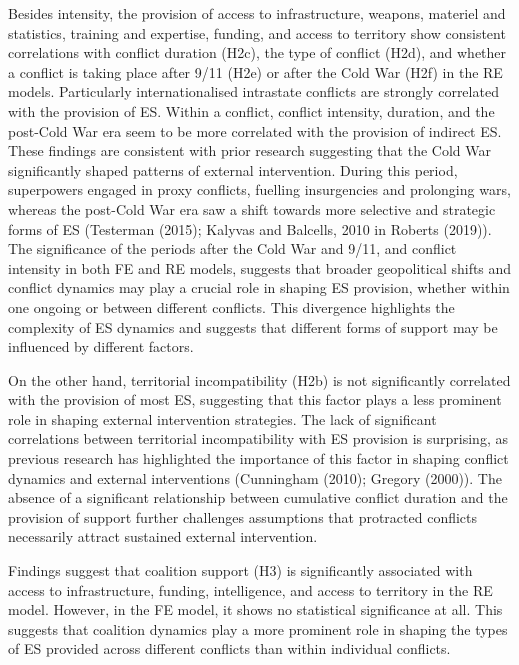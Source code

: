 \documentclass[
]{article}
\begin{document}
Besides intensity, the provision of access to infrastructure, weapons,
materiel and statistics, training and expertise, funding, and access to
territory show consistent correlations with conflict duration (H2c), the
type of conflict (H2d), and whether a conflict is taking place after
9/11 (H2e) or after the Cold War (H2f) in the RE models. Particularly
internationalised intrastate conflicts are strongly correlated with the
provision of ES. Within a conflict, conflict intensity, duration, and
the post-Cold War era seem to be more correlated with the provision of
indirect ES. These findings are consistent with prior research
suggesting that the Cold War significantly shaped patterns of external
intervention. During this period, superpowers engaged in proxy
conflicts, fuelling insurgencies and prolonging wars, whereas the
post-Cold War era saw a shift towards more selective and strategic forms
of ES (Testerman (2015); Kalyvas and Balcells, 2010 in Roberts (2019)).
The significance of the periods after the Cold War and 9/11, and
conflict intensity in both FE and RE models, suggests that broader
geopolitical shifts and conflict dynamics may play a crucial role in
shaping ES provision, whether within one ongoing or between different
conflicts. This divergence highlights the complexity of ES dynamics and
suggests that different forms of support may be influenced by different
factors.

On the other hand, territorial incompatibility (H2b) is not
significantly correlated with the provision of most ES, suggesting that
this factor plays a less prominent role in shaping external intervention
strategies. The lack of significant correlations between territorial
incompatibility with ES provision is surprising, as previous research
has highlighted the importance of this factor in shaping conflict
dynamics and external interventions (Cunningham (2010); Gregory (2000)).
The absence of a significant relationship between cumulative conflict
duration and the provision of support further challenges assumptions
that protracted conflicts necessarily attract sustained external
intervention.

Findings suggest that coalition support (H3) is significantly associated
with access to infrastructure, funding, intelligence, and access to
territory in the RE model. However, in the FE model, it shows no
statistical significance at all. This suggests that coalition dynamics
play a more prominent role in shaping the types of ES provided across
different conflicts than within individual conflicts.
\end{document}
